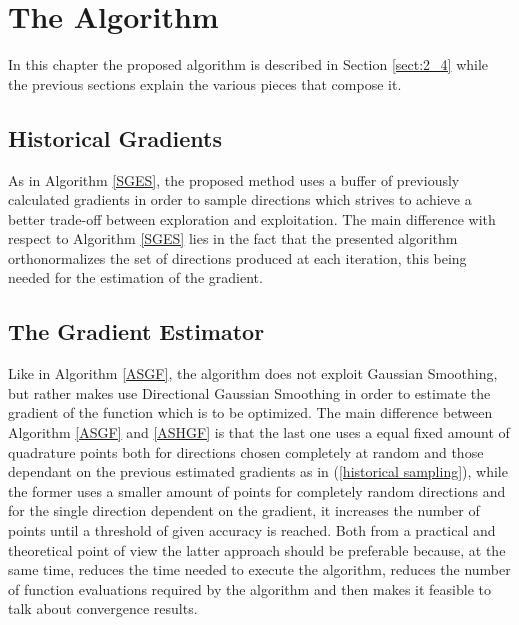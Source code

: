 
\chapter{The Algorithm}\label{chapt:3}

In this chapter the proposed algorithm is described in Section \ref{sect:2_4} while the previous sections explain the various pieces that compose it.


\section{Historical Gradients}\label{sect:3_2}

As in Algorithm \ref{SGES}, the proposed method uses a buffer of previously calculated gradients in order to sample directions which strives to achieve a better trade-off between exploration and exploitation. The main difference with respect to Algorithm \ref{SGES} lies in the fact that the presented algorithm orthonormalizes the set of directions produced at each iteration, this being needed for the estimation of the gradient.


\section{The Gradient Estimator}

Like in Algorithm \ref{ASGF}, the algorithm does not exploit Gaussian Smoothing, but rather makes use Directional Gaussian Smoothing in order to estimate the gradient of the function which is to be optimized. The main difference between Algorithm \ref{ASGF} and \ref{ASHGF} is that the last one uses a equal fixed amount of quadrature points both for directions chosen completely at random and those dependant on the previous estimated gradients as in (\ref{historical sampling}), while the former uses a smaller amount of points for completely random directions and for the single direction dependent on the gradient, it increases the number of points until a threshold of given accuracy is reached. Both from a practical and theoretical point of view the latter approach should be preferable because, at the same time, reduces the time needed to execute the algorithm, reduces the number of function evaluations required by the algorithm and then makes it feasible to talk about convergence results.

